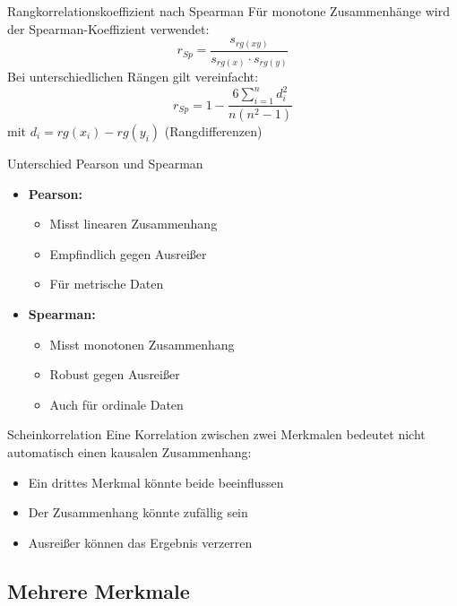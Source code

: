 \begin{definition}{Rangkorrelationskoeffizient nach Spearman}
Für monotone Zusammenhänge wird der Spearman-Koeffizient verwendet:
$$r_{Sp} = \frac{s_{rg(xy)}}{s_{rg(x)} \cdot s_{rg(y)}}$$
Bei unterschiedlichen Rängen gilt vereinfacht:
$$r_{Sp} = 1 - \frac{6\sum_{i=1}^n d_i^2}{n(n^2-1)}$$
mit $d_i = rg(x_i) - rg(y_i)$ (Rangdifferenzen)
\end{definition}

\begin{concept}{Unterschied Pearson und Spearman}
\begin{itemize}
    \item \textbf{Pearson:}
    \begin{itemize}
        \item Misst linearen Zusammenhang
        \item Empfindlich gegen Ausreißer
        \item Für metrische Daten
    \end{itemize}
    \item \textbf{Spearman:}
    \begin{itemize}
        \item Misst monotonen Zusammenhang
        \item Robust gegen Ausreißer
        \item Auch für ordinale Daten
    \end{itemize}
\end{itemize}
\end{concept}

\begin{remark}{Scheinkorrelation}
Eine Korrelation zwischen zwei Merkmalen bedeutet nicht automatisch einen kausalen Zusammenhang:
\begin{itemize}
    \item Ein drittes Merkmal könnte beide beeinflussen
    \item Der Zusammenhang könnte zufällig sein
    \item Ausreißer können das Ergebnis verzerren
\end{itemize}
\end{remark}

\subsection{Mehrere Merkmale}

